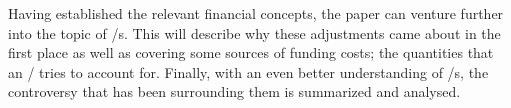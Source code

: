 \documentclass[main.tex]{subfiles}
\begin{document}
    Having established the relevant financial concepts, 
    the paper can venture further into the topic of \FVA/s.
    This  will describe why these adjustments came about in the first place
    as well as covering some sources of funding costs; 
    the quantities that an \FVA/ tries to account for.
    Finally, with an even better understanding of \FVA/s, 
    the controversy that has been surrounding them is summarized and analysed. 
    
\end{document}
